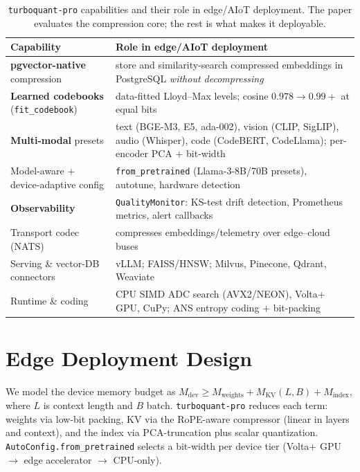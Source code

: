 \documentclass[10pt,conference,compsoc]{IEEEtran}
\begin{document}
\begin{table}[t]
\caption{\texttt{turboquant-pro} capabilities and their role in edge/AIoT
deployment. The paper evaluates the compression core; the rest is what makes it
deployable.}
\label{tab:caps}
\centering
\footnotesize
\begin{tabular}{p{2.45cm}p{4.95cm}}
\toprule
Capability & Role in edge/AIoT deployment \\
\midrule
\textbf{pgvector-native} compression & store and similarity-search compressed
embeddings in PostgreSQL \emph{without decompressing} \\
\textbf{Learned codebooks} (\texttt{fit\_codebook}) & data-fitted Lloyd--Max
levels; cosine $0.978\!\to\!0.99{+}$ at equal bits \\
\textbf{Multi-modal} presets & text (BGE-M3, E5, ada-002), vision (CLIP, SigLIP),
audio (Whisper), code (CodeBERT, CodeLlama); per-encoder PCA $+$ bit-width \\
Model-aware $+$ device-adaptive config & \texttt{from\_pretrained} (Llama-3-8B/70B
presets), autotune, hardware detection \\
\textbf{Observability} & \texttt{QualityMonitor}: KS-test drift detection,
Prometheus metrics, alert callbacks \\
Transport codec (NATS) & compresses embeddings/telemetry over edge--cloud buses \\
Serving \& vector-DB connectors & vLLM; FAISS/HNSW; Milvus, Pinecone, Qdrant,
Weaviate \\
Runtime \& coding & CPU SIMD ADC search (AVX2/NEON), Volta+ GPU, CuPy; ANS entropy coding $+$
bit-packing \\
\bottomrule
\end{tabular}
\end{table}

\section{Edge Deployment Design}
We model the device memory budget as
$M_{\text{dev}} \ge M_{\text{weights}} + M_{\text{KV}}(L, B) + M_{\text{index}}$,
where $L$ is context length and $B$ batch. \texttt{turboquant-pro} reduces each
term: weights via low-bit packing, KV via the RoPE-aware compressor (linear in
layers and context), and the index via PCA-truncation plus scalar quantization.
\texttt{AutoConfig.from\_pretrained} selects a bit-width per device tier (Volta+
GPU $\rightarrow$ edge accelerator $\rightarrow$ CPU-only).
\end{document}
